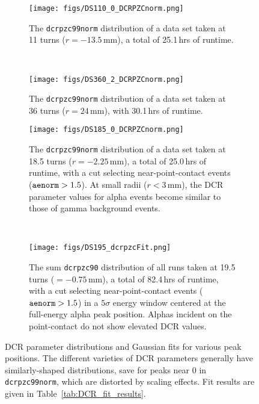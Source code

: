 \documentclass[groupedaddress,rmp,amsmath,amssymb,bibnotes,altaffilletter,twocolumn]{revtex4-1}
\begin{document}
\begin{figure*}[]
 \centering
  \begin{subfigure}[]{.45\textwidth}
 \texttt{[image: figs/DS110\_0\_DCRPZCnorm.png]}
  \caption{The {\tt dcrpzc99norm} distribution of a data set taken at 11 turns ($r= -13.5$\,mm), a total of 25.1\,hrs of runtime.}
 \label{fig:DCRfit_110}
\end{subfigure}
~
  \begin{subfigure}[]{.45\textwidth}
 \texttt{[image: figs/DS360\_2\_DCRPZCnorm.png]}
  \caption{The {\tt dcrpzc99norm} distribution of a data set taken at 36 turns ($r = 24$\,mm), with 30.1\,hrs of runtime.}
 \label{fig:DCRfit_360}
\end{subfigure}

 \begin{subfigure}[]{.45\textwidth}
 \texttt{[image: figs/DS185\_0\_DCRPZCnorm.png]}
  \caption{The {\tt dcrpzc99norm} distribution of a data set taken at 18.5 turns ($r = -2.25$\,mm), a total of 25.0\,hrs of runtime, with a cut selecting near-point-contact events (${\tt aenorm} > 1.5$). At small radii ($r<3$\,mm), the DCR parameter values for alpha events become similar to those of gamma background events.}
 \label{fig:DCRfit_185}
\end{subfigure}
~
 \begin{subfigure}[]{.45\textwidth}
 \texttt{[image: figs/DS195\_dcrpzcFit.png]}
 \caption{The sum {\tt dcrpzc90} distribution of all runs taken at 19.5 turns ($ = -0.75$\,mm), a total of 82.4\,hrs of runtime, with a cut selecting near-point-contact events (${\tt aenorm} > 1.5$) in a $5\sigma$ energy window centered at the full-energy alpha peak position. Alphas incident on the point-contact do not show elevated DCR values.}
 \label{fig:Efit_195}
\end{subfigure}
 \caption{DCR parameter distributions and Gaussian fits for various peak positions. The different varieties of DCR parameters generally have similarly-shaped distributions, save for peaks near 0 in {\tt dcrpzc99norm}, which are distorted by scaling effects. Fit results are given in Table~\ref{tab:DCR_fit_results}.} 
 \label{fig:DCRpeaks}
\end{figure*}
\end{document}
